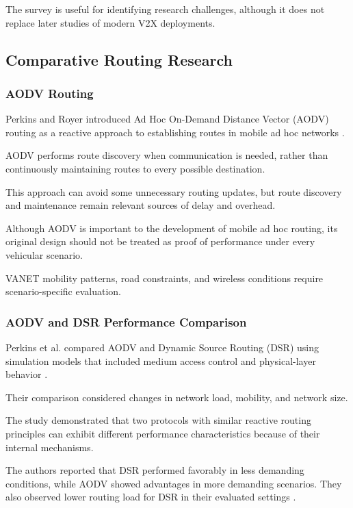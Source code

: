 The survey is useful for identifying
research challenges, although it
does not replace later studies
of modern V2X deployments.

\subsection{Comparative Routing Research}

\subsubsection{AODV Routing}

Perkins and Royer introduced
Ad Hoc On-Demand Distance Vector
(AODV) routing as a reactive
approach to establishing routes
in mobile ad hoc networks
\cite{Perkins1999}.

AODV performs route discovery
when communication is needed,
rather than continuously
maintaining routes to every
possible destination.

This approach can avoid some
unnecessary routing updates,
but route discovery and
maintenance remain relevant
sources of delay and overhead.

Although AODV is important
to the development of mobile
ad hoc routing, its original
design should not be treated
as proof of performance
under every vehicular scenario.

VANET mobility patterns,
road constraints, and
wireless conditions require
scenario-specific evaluation.

\subsubsection{AODV and DSR Performance Comparison}

Perkins et al. compared AODV
and Dynamic Source Routing (DSR)
using simulation models that
included medium access control
and physical-layer behavior
\cite{Perkins2001}.

Their comparison considered
changes in network load,
mobility, and network size.

The study demonstrated that
two protocols with similar
reactive routing principles
can exhibit different
performance characteristics
because of their internal
mechanisms.

The authors reported that
DSR performed favorably in
less demanding conditions,
while AODV showed advantages
in more demanding scenarios.
They also observed lower
routing load for DSR in
their evaluated settings
\cite{Perkins2001}.


